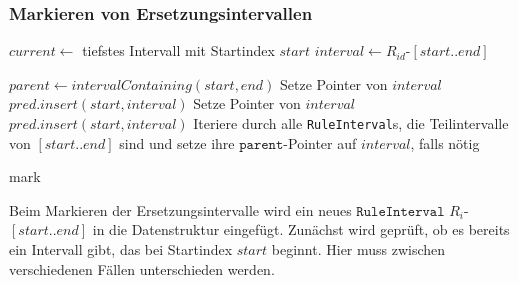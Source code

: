 \subsubsection{Markieren von Ersetzungsintervallen}

\begin{algorithm}[t]
    $current \leftarrow$ tiefstes Intervall mit Startindex $start$\;
    $interval \leftarrow R_{id}$-$[start..end]$\;

     {
        $parent \leftarrow intervalContaining(start, end)$\;
        Setze Pointer von $interval$\;
        $pred.insert(start, interval)$\;
    }
     {
        Setze Pointer von $interval$
        $pred.insert(start, interval)$\;
    }
    Iteriere durch alle \texttt{RuleInterval}s, die Teilintervalle von $[start..end]$ sind und setze ihre $\texttt{parent}$-Pointer auf $interval$, falls nötig\;
    \caption{mark}
    \label{markv4}
\end{algorithm}


Beim Markieren der Ersetzungsintervalle wird ein neues $\texttt{RuleInterval}$ $R_i$-$[start..end]$ in die Datenstruktur eingefügt. 
Zunächst wird geprüft, ob es bereits ein Intervall gibt, das bei Startindex $start$ beginnt.
Hier muss zwischen verschiedenen Fällen unterschieden werden.

